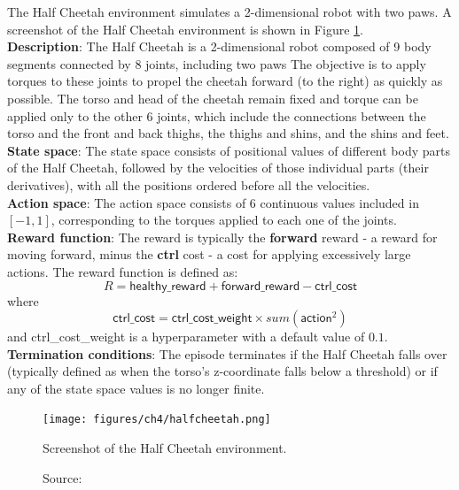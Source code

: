 The Half Cheetah environment \cite{halfcheetahfarama} 
simulates a 2-dimensional robot with two paws.
A screenshot of the Half Cheetah environment is shown
in Figure \ref{fig:halfcheetah}.\\
\textbf{Description}: The Half Cheetah is a 2-dimensional robot
composed of 9 body segments connected by 8 joints, including two paws
The objective is to apply torques to these joints to propel the
cheetah forward (to the right) as quickly as possible.
The torso and head of the cheetah remain fixed
and torque can be applied only to the other 6 joints,
which include the connections between the torso and
the front and back thighs, the thighs and shins, and the shins and feet.\\
\textbf{State space}: The state space consists of positional values
of different body parts of the Half Cheetah, followed by the velocities
of those individual parts (their derivatives), with all the positions
ordered before all the velocities.\\
\textbf{Action space}: The action space consists of $6$ continuous values
included in $[-1, 1]$,
corresponding to the torques applied to each one of the joints.\\
\textbf{Reward function}: The reward is typically
 the \textbf{forward} reward
- a reward for moving forward, minus the \textbf{ctrl} cost
- a cost for applying excessively large actions.
The reward function is defined as:
\begin{equation}
    R = \textsf{healthy\_reward} + \textsf{forward\_reward} - \textsf{ctrl\_cost}
\end{equation}
where
\begin{equation}
    \textsf{ctrl\_cost} = \textsf{ctrl\_cost\_weight} \times sum(\textsf{action}^2)
\end{equation}
and \textsf{ctrl\_cost\_weight} is a hyperparameter with a default value of $0.1$.\\
\textbf{Termination conditions}: The episode terminates if the
Half Cheetah falls over
(typically defined as when the torso's z-coordinate falls below a threshold)
or if any of the state space values is no longer finite.

\begin{figure}[h]
    \centering
    \texttt{[image: figures/ch4/halfcheetah.png]}
    \caption{Screenshot of the Half Cheetah environment.}
    \vspace{-10px}
    \caption*{\scriptsize{Source: \cite{halfcheetahpic}}}
    \label{fig:halfcheetah}
\end{figure}

